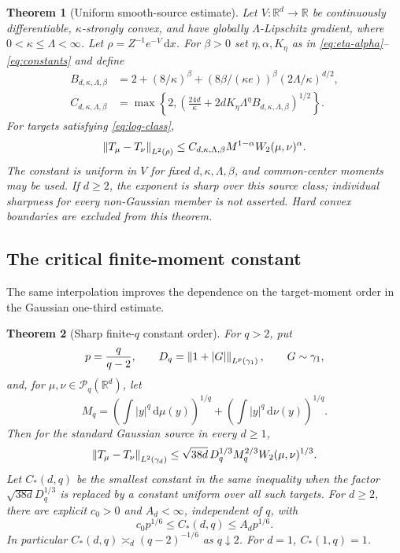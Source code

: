 \documentclass[11pt]{article}
\numberwithin{equation}{section}
\newtheorem{theorem}{Theorem}[section]
\theoremstyle{remark}\newtheorem{remark}[theorem]{Remark}
\newcommand{\R}{\mathbb R}\newcommand{\E}{\mathbb E}
\newcommand{\Prob}{\mathcal P}\newcommand{\dd}{\,\mathrm d}
\begin{document}
\begin{theorem}[Uniform smooth-source estimate]\label{thm:smooth}
Let $V:\R^d\to\R$ be continuously differentiable, $\kappa$-strongly convex, and have globally $\Lambda$-Lipschitz gradient, where $0<\kappa\le\Lambda<\infty$. Let $\rho=Z^{-1}e^{-V}\dd x$. For $\beta>0$ set $\eta,\alpha,K_\eta$ as in \eqref{eq:eta-alpha}--\eqref{eq:constants} and define
\begin{align}
 B_{d,\kappa,\Lambda,\beta}
 &=2+(8/\kappa)^\beta
     +(8\beta/(\kappa e))^\beta(2\Lambda/\kappa)^{d/2},\label{eq:smooth-B}\\
 C_{d,\kappa,\Lambda,\beta}
 &=\max\left\{2,
 \left(\frac{24d}{\kappa}
       +2dK_\eta\Lambda^\eta B_{d,\kappa,\Lambda,\beta}\right)^{1/2}\right\}.
 \label{eq:smooth-C}
\end{align}
For targets satisfying \eqref{eq:log-class},
\begin{equation}\label{eq:smooth-main}
 \left\lVert T_\mu-T_\nu\right\rVert_{L^2(\rho)}
 \le C_{d,\kappa,\Lambda,\beta}M^{1-\alpha}W_2(\mu,\nu)^\alpha.
\end{equation}
The constant is uniform in $V$ for fixed $d,\kappa,\Lambda,\beta$, and common-center moments may be used. If $d\ge2$, the exponent is sharp over this source class; individual sharpness for every non-Gaussian member is not asserted. Hard convex boundaries are excluded from this theorem.
\end{theorem}

\subsection{The critical finite-moment constant}
The same interpolation improves the dependence on the target-moment order in the Gaussian one-third estimate.

\begin{theorem}[Sharp finite-$q$ constant order]\label{thm:q}
For $q>2$, put
\[
 p=\frac q{q-2},\qquad D_q=\left\lVert1+|G|\right\rVert_{L^p(\gamma_1)},\qquad G\sim\gamma_1,
\]
and, for $\mu,\nu\in\Prob_q(\R^d)$, let
\[
 M_q=\left(\int|y|^q\dd\mu(y)\right)^{1/q}
     +\left(\int|y|^q\dd\nu(y)\right)^{1/q}.
\]
Then for the standard Gaussian source in every $d\ge1$,
\begin{equation}\label{eq:q-upper}
 \left\lVert T_\mu-T_\nu\right\rVert_{L^2(\gamma_d)}
 \le\sqrt{38d}\,D_q^{1/3}M_q^{2/3}W_2(\mu,\nu)^{1/3}.
\end{equation}
Let $C_*(d,q)$ be the smallest constant in the same inequality when the factor $\sqrt{38d}D_q^{1/3}$ is replaced by a constant uniform over all such targets. For $d\ge2$, there are explicit $c_0>0$ and $A_d<\infty$, independent of $q$, with
\begin{equation}\label{eq:q-sharp-order}
 c_0p^{1/6}\le C_*(d,q)\le A_dp^{1/6}.
\end{equation}
In particular $C_*(d,q)\asymp_d(q-2)^{-1/6}$ as $q\downarrow2$. For $d=1$, $C_*(1,q)=1$.
\end{theorem}
\end{document}
